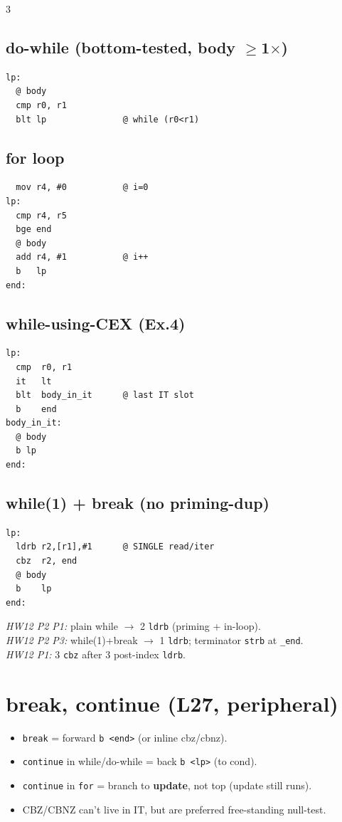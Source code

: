 \documentclass[8pt,landscape]{extarticle}
\newcommand{\asm}[1]{\texttt{\scriptsize #1}}
\newcommand{\cee}[1]{\texttt{\scriptsize #1}}
\begin{document}
\begin{multicols*}{3}
\subsection{do-while (bottom-tested, body $\ge$1$\times$)}
\begin{lstlisting}
lp:
  @ body
  cmp r0, r1
  blt lp               @ while (r0<r1)
\end{lstlisting}

\subsection{for loop}
\begin{lstlisting}
  mov r4, #0           @ i=0
lp:
  cmp r4, r5
  bge end
  @ body
  add r4, #1           @ i++
  b   lp
end:
\end{lstlisting}

\subsection{while-using-CEX (Ex.4)}
\begin{lstlisting}
lp:
  cmp  r0, r1
  it   lt
  blt  body_in_it      @ last IT slot
  b    end
body_in_it:
  @ body
  b lp
end:
\end{lstlisting}

\subsection{while(1) + break (no priming-dup)}
\begin{lstlisting}
lp:
  ldrb r2,[r1],#1      @ SINGLE read/iter
  cbz  r2, end
  @ body
  b    lp
end:
\end{lstlisting}

\textit{HW12 P2 P1:} plain while $\to$ 2 \asm{ldrb} (priming + in-loop).\\
\textit{HW12 P2 P3:} while(1)+break $\to$ 1 \asm{ldrb}; terminator \asm{strb} at \texttt{\_end}.\\
\textit{HW12 P1:} 3 \asm{cbz} after 3 post-index \asm{ldrb}.

\section{break, continue (L27, peripheral)}
\begin{itemize}
\item \cee{break} = forward \asm{b <end>} (or inline cbz/cbnz).
\item \cee{continue} in while/do-while = back \asm{b <lp>} (to cond).
\item \cee{continue} in \texttt{for} = branch to \textbf{update}, not top (update still runs).
\item CBZ/CBNZ can't live in IT, but are preferred free-standing null-test.
\end{itemize}


\end{multicols*}
\end{document}

